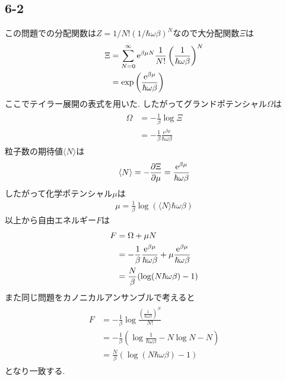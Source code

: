 \subsection*{6-2}
この問題での分配関数は$Z=1/N!(1/\hbar\omega\beta)^N$なので大分配関数$\Xi$は
\begin{align}
  \begin{split}
    \Xi&=\sum_{N=0}^\infty{\rm e}^{\beta\mu N}\frac{1}{N!}\left(\frac{1}{\hbar\omega\beta}\right)^N\\
    &=\exp\left(\frac{{\rm e}^{\beta\mu}}{\hbar\omega\beta}\right)
  \end{split}
\end{align}
ここでテイラー展開の表式を用いた.
したがってグランドポテンシャル$\Omega$は
\begin{align}
  \begin{split}
    \Omega&=-\frac{1}{\beta}\log\Xi\\
    &=-\frac{1}{\beta}\frac{e^{\beta\mu}}{\hbar\omega\beta}
  \end{split}
\end{align}
粒子数の期待値$\langle N\rangle$は
\begin{align}
  \langle N\rangle=-\frac{\partial\Xi}{\partial\mu}=\frac{{\rm e}^{\beta\mu}}{\hbar\omega\beta}
\end{align}
したがって化学ポテンシャル$\mu$は
\begin{align}
  \mu=\frac{1}{\beta}\log(\langle N\rangle\hbar\omega\beta)
\end{align}
以上から自由エネルギー$F$は
\begin{align}
  \begin{split}
    F&=\Omega+\mu N\\
    &=-\frac{1}{\beta}\frac{{\rm e}^{\beta\mu}}{\hbar\omega\beta}+\mu\frac{{\rm e}^{\beta\mu}}{\hbar\omega\beta}\\
    &=\frac{N}{\beta}(\log(N\hbar\omega\beta)-1)
  \end{split}
\end{align}
また同じ問題をカノニカルアンサンブルで考えると
\begin{align}
  \begin{split}
    F&=-\frac{1}{\beta}\log\frac{\left(\frac{1}{\hbar\omega\beta}\right)^N}{N!}\\
    &=-\frac{1}{\beta}(\log\frac{1}{\hbar\omega\beta}-N\log N-N)\\
    &=\frac{N}{\beta}(\log(N\hbar\omega\beta)-1)
  \end{split}
\end{align}
となり一致する.